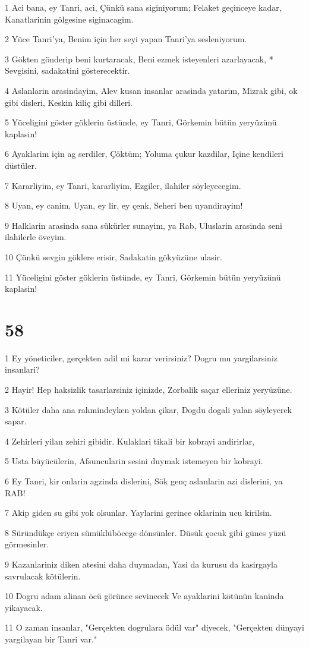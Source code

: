 \par 1 Aci bana, ey Tanri, aci, Çünkü sana siginiyorum; Felaket geçinceye kadar, Kanatlarinin gölgesine siginacagim.
\par 2 Yüce Tanri'ya, Benim için her seyi yapan Tanri'ya sesleniyorum.
\par 3 Gökten gönderip beni kurtaracak, Beni ezmek isteyenleri azarlayacak, * Sevgisini, sadakatini gösterecektir.
\par 4 Aslanlarin arasindayim, Alev kusan insanlar arasinda yatarim, Mizrak gibi, ok gibi disleri, Keskin kiliç gibi dilleri.
\par 5 Yüceligini göster göklerin üstünde, ey Tanri, Görkemin bütün yeryüzünü kaplasin!
\par 6 Ayaklarim için ag serdiler, Çöktüm; Yoluma çukur kazdilar, Içine kendileri düstüler.
\par 7 Kararliyim, ey Tanri, kararliyim, Ezgiler, ilahiler söyleyecegim.
\par 8 Uyan, ey canim, Uyan, ey lir, ey çenk, Seheri ben uyandirayim!
\par 9 Halklarin arasinda sana sükürler sunayim, ya Rab, Uluslarin arasinda seni ilahilerle öveyim.
\par 10 Çünkü sevgin göklere erisir, Sadakatin gökyüzüne ulasir.
\par 11 Yüceligini göster göklerin üstünde, ey Tanri, Görkemin bütün yeryüzünü kaplasin!

\chapter{58}

\par 1 Ey yöneticiler, gerçekten adil mi karar verirsiniz? Dogru mu yargilarsiniz insanlari?
\par 2 Hayir! Hep haksizlik tasarlarsiniz içinizde, Zorbalik saçar elleriniz yeryüzüne.
\par 3 Kötüler daha ana rahmindeyken yoldan çikar, Dogdu dogali yalan söyleyerek sapar.
\par 4 Zehirleri yilan zehiri gibidir. Kulaklari tikali bir kobrayi andirirlar,
\par 5 Usta büyücülerin, Afsuncularin sesini duymak istemeyen bir kobrayi.
\par 6 Ey Tanri, kir onlarin agzinda dislerini, Sök genç aslanlarin azi dislerini, ya RAB!
\par 7 Akip giden su gibi yok olsunlar. Yaylarini gerince oklarinin ucu kirilsin.
\par 8 Süründükçe eriyen sümüklüböcege dönsünler. Düsük çocuk gibi günes yüzü görmesinler.
\par 9 Kazanlariniz diken atesini daha duymadan, Yasi da kurusu da kasirgayla savrulacak kötülerin.
\par 10 Dogru adam alinan öcü görünce sevinecek Ve ayaklarini kötünün kaninda yikayacak.
\par 11 O zaman insanlar, "Gerçekten dogrulara ödül var" diyecek, "Gerçekten dünyayi yargilayan bir Tanri var."

